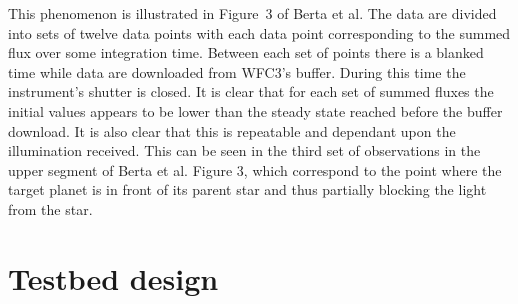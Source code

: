 \documentclass{spie}
\begin{document}
\par 
This phenomenon is illustrated in Figure~3 of Berta et al.\cite{Berta2012} The data are divided into sets of twelve data points with each data point corresponding to the summed flux over some integration time. Between each set of points there is a blanked time while data are downloaded from WFC3's buffer. During this time the instrument's shutter is closed. It is clear that for each set of summed fluxes the initial values appears to be lower than the steady state reached before the buffer download. It is also clear that this is repeatable and dependant upon the illumination received. This can be seen in the third set of observations in the upper segment of Berta et al. Figure 3, which correspond to the point where the target planet is in front of its parent star and thus partially blocking the light from the star.
%
\section{Testbed design}\label{sec:design}
\end{document}
